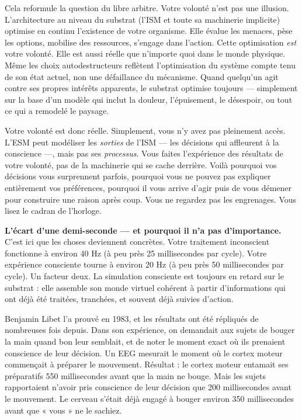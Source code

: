 \documentclass[11pt, twoside, openright]{book}
\begin{document}
Cela reformule la question du libre arbitre. Votre volonté n'est pas une illusion. L'architecture au niveau du substrat (l'ISM et toute sa machinerie implicite) optimise en continu l'existence de votre organisme. Elle évalue les menaces, pèse les options, mobilise des ressources, s'engage dans l'action. Cette optimisation \textit{est} votre volonté. Elle est aussi réelle que n'importe quoi dans le monde physique. Même les choix autodestructeurs reflètent l'optimisation du système compte tenu de son état actuel, non une défaillance du mécanisme. Quand quelqu'un agit contre ses propres intérêts apparents, le substrat optimise toujours --- simplement sur la base d'un modèle qui inclut la douleur, l'épuisement, le désespoir, ou tout ce qui a remodelé le paysage.

Votre volonté est donc réelle. Simplement, vous n'y avez pas pleinement accès. L'ESM peut modéliser les \textit{sorties} de l'ISM --- les décisions qui affleurent à la conscience ---, mais pas ses \textit{processus}. Vous faites l'expérience des résultats de votre volonté, pas de la machinerie qui se cache derrière. Voilà pourquoi vos décisions vous surprennent parfois, pourquoi vous ne pouvez pas expliquer entièrement vos préférences, pourquoi il vous arrive d'agir puis de vous démener pour construire une raison après coup. Vous ne regardez pas les engrenages. Vous lisez le cadran de l'horloge.

\textbf{L'écart d'une demi-seconde --- et pourquoi il n'a pas d'importance.} C'est ici que les choses deviennent concrètes. Votre traitement inconscient fonctionne à environ 40 Hz (à peu près 25 millisecondes par cycle). Votre expérience consciente tourne à environ 20 Hz (à peu près 50 millisecondes par cycle). Un facteur deux. La simulation consciente est toujours en retard sur le substrat : elle assemble son monde virtuel cohérent à partir d'informations qui ont déjà été traitées, tranchées, et souvent déjà suivies d'action.

Benjamin Libet l'a prouvé en 1983, et les résultats ont été répliqués de nombreuses fois depuis. Dans son expérience, on demandait aux sujets de bouger la main quand bon leur semblait, et de noter le moment exact où ils prenaient conscience de leur décision. Un EEG mesurait le moment où le cortex moteur commençait à préparer le mouvement. Résultat : le cortex moteur entamait ses préparatifs 550 millisecondes avant que la main ne bouge. Mais les sujets rapportaient n'avoir pris conscience de leur décision que 200 millisecondes avant le mouvement. Le cerveau s'était déjà engagé à bouger environ 350 millisecondes avant que « vous » ne le sachiez.
\end{document}
